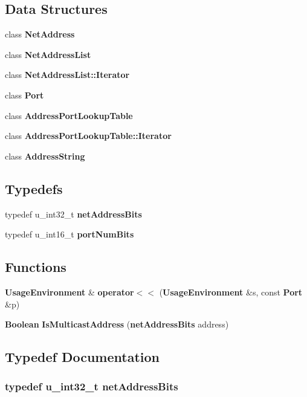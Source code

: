 \subsection*{Data Structures}
\begin{DoxyCompactItemize}
\item 
class {\bf Net\+Address}
\item 
class {\bf Net\+Address\+List}
\item 
class {\bf Net\+Address\+List\+::\+Iterator}
\item 
class {\bf Port}
\item 
class {\bf Address\+Port\+Lookup\+Table}
\item 
class {\bf Address\+Port\+Lookup\+Table\+::\+Iterator}
\item 
class {\bf Address\+String}
\end{DoxyCompactItemize}
\subsection*{Typedefs}
\begin{DoxyCompactItemize}
\item 
typedef u\+\_\+int32\+\_\+t {\bf net\+Address\+Bits}
\item 
typedef u\+\_\+int16\+\_\+t {\bf port\+Num\+Bits}
\end{DoxyCompactItemize}
\subsection*{Functions}
\begin{DoxyCompactItemize}
\item 
{\bf Usage\+Environment} \& {\bf operator$<$$<$} ({\bf Usage\+Environment} \&s, const {\bf Port} \&p)
\item 
{\bf Boolean} {\bf Is\+Multicast\+Address} ({\bf net\+Address\+Bits} address)
\end{DoxyCompactItemize}


\subsection{Typedef Documentation}
\subsubsection[{net\+Address\+Bits}]{\setlength{\rightskip}{0pt plus 5cm}typedef u\+\_\+int32\+\_\+t {\bf net\+Address\+Bits}}\label{NetAddress_8hh_aa610d7f0f0c1d523847ee614ad2108b3}


